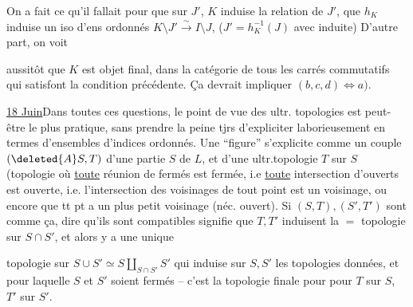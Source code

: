 On a fait ce qu'il fallait pour que sur $J'$, $K$ induise la relation de $J'$, que $h_K$ induise un iso d'ens ordonnés $K\setminus J'\xrightarrow{\sim}I\setminus J$,     ($J'=h_K^{-1}(J)$ avec  induite) D'autre part, on voit

aussitôt que $K$ est objet final, dans la catégorie de tous les carrés commutatifs
  qui satisfont la condition précédente. Ça devrait impliquer $(b,c,d)\Longleftrightarrow a)$.

\uline{18 Juin}\quad Dans toutes ces questions, le point de vue des ultr. topologies  est peut-être le plus pratique, sans prendre la peine tjrs d'expliciter laborieusement en termes d'ensembles d'indices ordonnés. Une ``figure''  s'explicite comme un couple $(\deleted{A}S,T)$ d'une partie $S$ de $L$, et d'une ultr.topologie $T$ sur $S$ (topologie où \uline{toute} réunion de fermés est fermée, i.e \uline{toute} intersection d'ouverts est ouverte, i.e. l'intersection des voisinages  de tout point est un voisinage, ou encore que tt pt a un plus petit voisinage (néc. ouvert). Si $(S,T),(S',T')$ sont comme ça, dire qu'ils sont compatibles signifie que $T,T'$ induisent la $=$ topologie sur $S\cap S'$,  et alors y a une unique

topologie sur $S\cup S'\simeq S\amalg_{S\cap S'}S'$ qui  induise sur $S,S'$ les topologies données, et pour laquelle $S$ et $S'$ soient fermés -- c'est la topologie finale pour
pour $T$ sur $S$, $T'$ sur $S'$.

